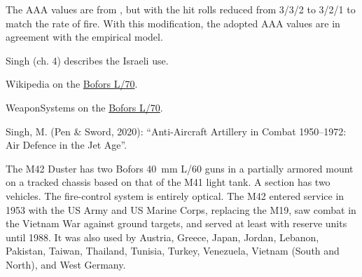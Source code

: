 \begin{withcounters}
{        

        The AAA values are from {\AirStr}, but with the hit rolls reduced from 3/3/2 to 3/2/1 to match the rate of fire.
        With this modification, the adopted AAA values are in agreement with the empirical model.

        Singh (ch. 4) describes the Israeli use.

        \begin{notesources}
            \item Wikipedia on the \href{https://en.wikipedia.org/wiki/Bofors_40_mm_Automatic_Gun_L/70}{Bofors L/70}.
            \item WeaponSystems on the \href{https://weaponsystems.net/system/932-Bofors\%20L/70}{Bofors L/70}.
            \item Singh, M. (Pen \& Sword, 2020): “Anti-Aircraft Artillery in Combat 1950--1972: Air Defence in the Jet Age”.
        \end{notesources}

    }


    The M42 Duster has two Bofors 40~mm L/60 guns in a partially armored mount on a tracked chassis based on that of the M41 light tank.
    A section has two vehicles.
    The fire-control system is entirely optical.
    The M42 entered service in 1953 with the US Army and US Marine Corps, replacing the M19, saw combat in the Vietnam War against ground targets, and served at least with reserve units until 1988. It was also used by Austria, Greece, Japan, Jordan, Lebanon, Pakistan, Taiwan, Thailand, Tunisia, Turkey, Venezuela, Vietnam (South and North), and West Germany.%


\end{withcounters}
